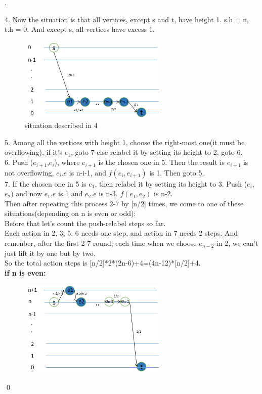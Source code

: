 \documentclass[12pt, notitlepage]{article}
\newenvironment{sol}
  {\par\vspace{3mm}\noindent{\it Solution}.}{\qed}
\begin{document}
\begin{sol}
\begin{enumerate}
4. Now the situation is that all vertices, except s and t,  have height 1. s.h = n, t.h = 0. And except s, all vertices have excess 1.\\
	\begin{figure}[H]\centering
	\includegraphics[width=7cm]{3.png}
	\caption{situation described in 4}
	\end{figure}
5. Among all the vertices with height 1, choose the right-most one(it must be overflowing), if it's $e_1$, goto 7 else relabel it  by setting its height to 2, goto 6.\\
6. Push ($e_{i+1}$,$e_i$), where $e_{i+1}$ is the chosen one in 5. Then the result is $e_{i+1}$ is not overflowing, $e_i.e$ is n-i-1, and $f(e_i,e_{i+1})$ is 1. Then goto 5.\\
7. If the chosen one in 5 is $e_1$, then relabel it by setting its height to 3. Push ($e_i$,$e_2$) and now $e_1.e$ is 1 and $e_2.e$ is n-3. $f(e_1,e_2)$ is n-2.\\
Then after repeating this process 2-7 by [n/2] times, we come to one of these situations(depending on n is even or odd):\\
Before that let's count the push-relabel steps so far. \\
Each action in 2, 3, 5, 6 needs one step, and action in 7 needs 2 steps. And remenber, after the first 2-7 round, each time when we choose $e_{n-2}$ in 2, we can't just lift it by one but by two.\\
So the total action steps is [n/2]*2*(2n-6)+4=(4n-12)*[n/2]+4.\\
\textbf{if n is even:}\\
	\begin{figure}[H]\centering
	\includegraphics[width=7cm]{4.png}

\end{figure}
\end{enumerate}
\end{sol}
\end{document}
